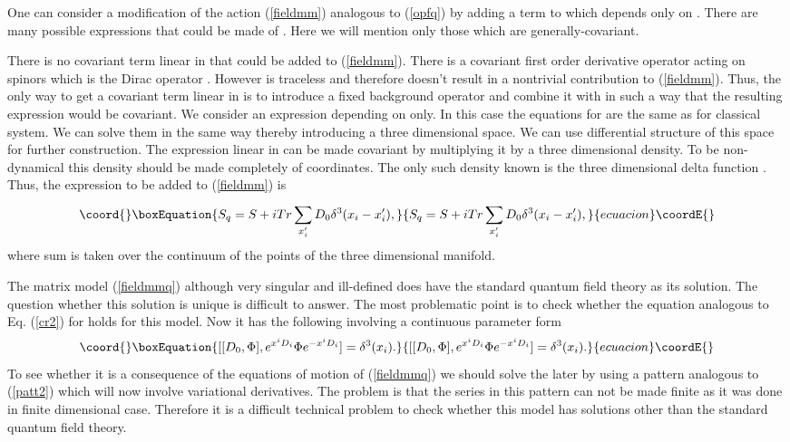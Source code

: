 \documentclass[a4paper,11pt]{article}
\begin{document}
One can consider a modification of the action (\ref{fieldmm})
analogous to (\ref{opfq}) by adding a term to \coordHE{} which depends
only on \coordHE{}. There are many possible expressions that could be
made of \coordHE{}. Here we will mention only those which are
generally-covariant.

There is no covariant term linear in \coordHE{} that could be added
to (\ref{fieldmm}). There is a covariant first order derivative
operator acting on spinors which is the Dirac operator
\coordHE{}. However
\coordHE{} is traceless and therefore doesn't
result in a nontrivial contribution to (\ref{fieldmm}). Thus, the
only way to get a covariant term linear in \coordHE{} is to introduce
a fixed background operator and combine it with \coordHE{} in such a
way that the resulting expression would be covariant. We consider
an expression depending on \coordHE{} only. In this case the equations
for \coordHE{} are the same as for classical system. We can solve them
in the same way thereby introducing a three dimensional space. We
can use differential structure of this space for further
construction.  The expression linear in \coordHE{} can be made
covariant by multiplying it by a three dimensional density. To be
non-dynamical this density should be made completely of
coordinates. The only such density known is the three dimensional
delta function \coordHE{}. Thus, the expression to be
added to (\ref{fieldmm}) is
\begin{equation}\coord{}\boxEquation{
S_q=S+i Tr \sum\limits_{x'_i}^{} D_0 \delta^3 (x_i-x'_i),
\label{fieldmmq}
}{
S_q=S+i Tr \sum\limits_{x'_i}^{} D_0 \delta^3 (x_i-x'_i),
}{ecuacion}\coordE{}\end{equation}
where sum is taken over the continuum of the points of the three
dimensional manifold.

The matrix model (\ref{fieldmmq}) although very singular and
ill-defined does have the standard quantum field theory as its
solution. The question whether this solution is unique is
difficult to answer. The most problematic point is to check
whether the equation analogous to Eq. (\ref{cr2}) for \coordHE{}
holds for this model. Now it has the following involving a
continuous parameter form
\begin{equation}\coord{}\boxEquation{
[[D_0,\Phi],e^{x^iD_i}\Phi e^{-x^iD_i}]=\delta^3(x_i).
\label{cr2ft}
}{
[[D_0,\Phi],e^{x^iD_i}\Phi e^{-x^iD_i}]=\delta^3(x_i).
}{ecuacion}\coordE{}\end{equation}
To see whether it is a consequence of the equations of motion of
(\ref{fieldmmq}) we should solve the later by using a pattern
analogous to (\ref{patt2}) which will now involve variational
derivatives. The problem is that the series in this pattern can
not be made finite as it was done in finite dimensional case.
Therefore it is a difficult technical problem to check whether
this model has solutions other than the standard quantum field
theory.
\end{document}
